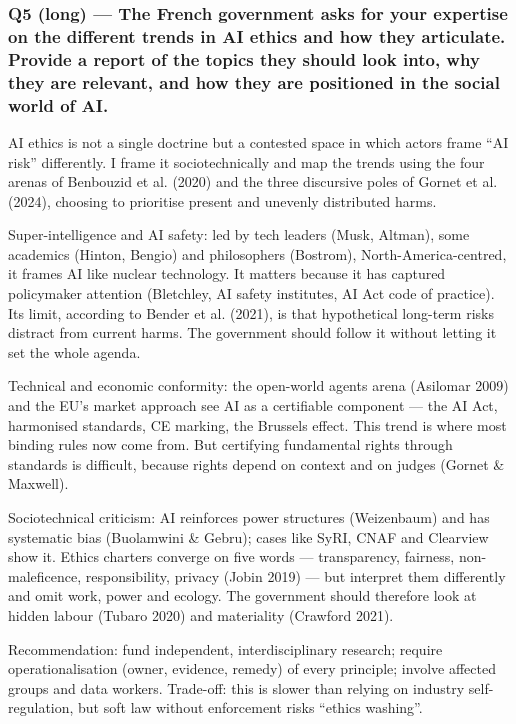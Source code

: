 \documentclass[11pt,a4paper]{article}
\newcommand{\blk}[1]{{\setlength{\fboxsep}{2pt}\colorbox{ink}{\sffamily\footnotesize\bfseries\color{white}\,#1\,}}}
\begin{document}
\subsubsection*{Q5 (long) — The French government asks for your expertise on the different trends in AI ethics and how they articulate. Provide a report of the topics they should look into, why they are relevant, and how they are positioned in the social world of AI.}
\begin{description}[leftmargin=1.2cm,style=sameline]
\item[\blk{F}] AI ethics is not a single doctrine but a contested space in which actors frame “AI risk” differently. I frame it sociotechnically and map the trends using the four arenas of Benbouzid et al. (2020) and the three discursive poles of Gornet et al. (2024), choosing to prioritise present and unevenly distributed harms.
\item[\blk{A1}] Super-intelligence and AI safety: led by tech leaders (Musk, Altman), some academics (Hinton, Bengio) and philosophers (Bostrom), North-America-centred, it frames AI like nuclear technology. It matters because it has captured policymaker attention (Bletchley, AI safety institutes, AI Act code of practice). Its limit, according to Bender et al. (2021), is that hypothetical long-term risks distract from current harms. The government should follow it without letting it set the whole agenda.
\item[\blk{A2}] Technical and economic conformity: the open-world agents arena (Asilomar 2009) and the EU’s market approach see AI as a certifiable component — the AI Act, harmonised standards, CE marking, the Brussels effect. This trend is where most binding rules now come from. But certifying fundamental rights through standards is difficult, because rights depend on context and on judges (Gornet \& Maxwell).
\item[\blk{A3}] Sociotechnical criticism: AI reinforces power structures (Weizenbaum) and has systematic bias (Buolamwini \& Gebru); cases like SyRI, CNAF and Clearview show it. Ethics charters converge on five words — transparency, fairness, non-maleficence, responsibility, privacy (Jobin 2019) — but interpret them differently and omit work, power and ecology. The government should therefore look at hidden labour (Tubaro 2020) and materiality (Crawford 2021).
\item[\blk{R}] Recommendation: fund independent, interdisciplinary research; require operationalisation (owner, evidence, remedy) of every principle; involve affected groups and data workers. Trade-off: this is slower than relying on industry self-regulation, but soft law without enforcement risks “ethics washing”.
\end{description}
\end{document}
